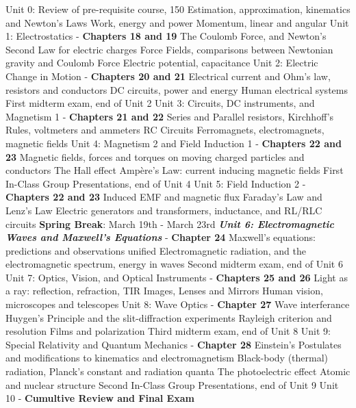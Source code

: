 \documentclass[10pt]{article}
\begin{document}
\begin{outline}[enumerate]
\1 Unit 0: Review of pre-requisite course, 150
\2 Estimation, approximation, kinematics and Newton's Laws
\2 Work, energy and power
\2 Momentum, linear and angular
\1 Unit 1: Electrostatics - \textbf{Chapters 18 and 19}
\2 The Coulomb Force, and Newton's Second Law for electric charges
\2 Force Fields, comparisons between Newtonian gravity and Coulomb Force
\2 Electric potential, capacitance
\1 Unit 2: Electric Change in Motion - \textbf{Chapters 20 and 21}
\2 Electrical current and Ohm's law, resistors and conductors
\2 DC circuits, power and energy
\2 Human electrical systems
\1 First midterm exam, end of Unit 2
\1 Unit 3: Circuits, DC instruments, and Magnetism 1 - \textbf{Chapters 21 and 22}
\2 Series and Parallel resistors, Kirchhoff's Rules, voltmeters and ammeters
\2 RC Circuits
\2 Ferromagnets, electromagnets, magnetic fields
\1 Unit 4: Magnetism 2 and Field Induction 1 - \textbf{Chapters 22 and 23}
\2 Magnetic fields, forces and torques on moving charged particles and conductors
\2 The Hall effect
\2 Amp\`{e}re's Law: current inducing magnetic fields
\1 First In-Class Group Presentations, end of Unit 4
\1 Unit 5: Field Induction 2 - \textbf{Chapters 22 and 23}
\2 Induced EMF and magnetic flux
\2 Faraday's Law and Lenz's Law
\2 Electric generators and transformers, inductance, and RL/RLC circuits
\1 \textbf{Spring Break}: March 19th - March 23rd
\1 \textit{\textbf{ Unit 6: Electromagnetic Waves and Maxwell's Equations}} - \textbf{Chapter 24}
\2 Maxwell's equations: predictions and observations unified
\2 Electromagnetic radiation, and the electromagnetic spectrum, energy in waves
\1 Second midterm exam, end of Unit 6
\1 Unit 7: Optics, Vision, and Optical Instruments - \textbf{Chapters 25 and 26}
\2 Light as a ray: reflection, refraction, TIR
\2 Images, Lenses and Mirrors
\2 Human vision, microscopes and telescopes
\1 Unit 8: Wave Optics - \textbf{Chapter 27}
\2 Wave interferance
\2 Huygen's Principle and the slit-diffraction experiments
\2 Rayleigh criterion and resolution
\2 Films and polarization
\1 Third midterm exam, end of Unit 8
\1 Unit 9: Special Relativity and Quantum Mechanics - \textbf{Chapter 28}
\2 Einstein's Postulates and modifications to kinematics and electromagnetism
\2 Black-body (thermal) radiation, Planck's constant and radiation quanta
\2 The photoelectric effect
\2 Atomic and nuclear structure
\1 Second In-Class Group Presentations, end of Unit 9
\1 Unit 10 - \textbf{Cumultive Review and Final Exam}
\end{outline}
\end{document}
